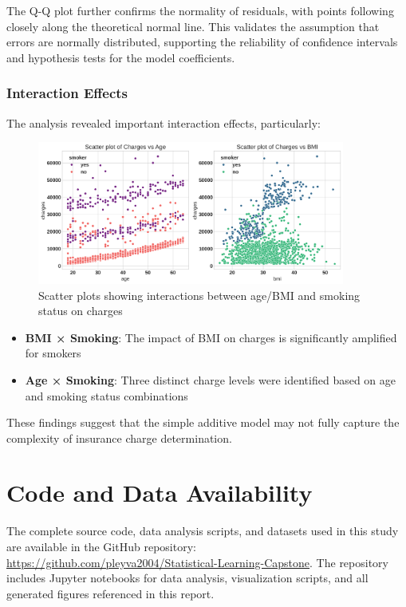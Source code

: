 \documentclass[12pt,a4paper]{article}
\begin{document}
The Q-Q plot further confirms the normality of residuals, with points following closely along the theoretical normal line. This validates the assumption that errors are normally distributed, supporting the reliability of confidence intervals and hypothesis tests for the model coefficients.

\subsubsection{Interaction Effects}

The analysis revealed important interaction effects, particularly:

\begin{figure}[H]
\centering
\includegraphics[width=0.9\textwidth]{scatter_plots_charges_vs_age_bmi.png}
\caption{Scatter plots showing interactions between age/BMI and smoking status on charges}
\label{fig:scatter_plots_charges_vs_age_bmi}
\end{figure}

\begin{itemize}
    \item \textbf{BMI × Smoking}: The impact of BMI on charges is significantly amplified for smokers
    \item \textbf{Age × Smoking}: Three distinct charge levels were identified based on age and smoking status combinations
\end{itemize}

These findings suggest that the simple additive model may not fully capture the complexity of insurance charge determination.

\section{Code and Data Availability}

The complete source code, data analysis scripts, and datasets used in this study are available in the GitHub repository: \url{https://github.com/pleyva2004/Statistical-Learning-Capstone}. The repository includes Jupyter notebooks for data analysis, visualization scripts, and all generated figures referenced in this report.
\end{document}
